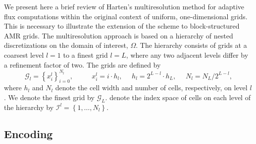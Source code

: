 \documentclass[]{article}
\begin{document}
    We present here a brief review of Harten's multiresolution method for
    adaptive flux computations within the original context of uniform,
    one-dimensional grids. This is necessary to illustrate the extension of the
    scheme to block-structured AMR grids. The multiresolution approach is based
    on a hierarchy of nested discretizations on the domain of interest,
    $\Omega$.  The hierarchy consists of grids at a coarsest level $l=1$ to a
    finest grid $l=L$, where any two adjacent levels differ by a refinement
    factor of two.  The grids are defined by
    \begin{equation}
        \bm{\mathcal{G}}_{l} = \left\{ x_{i}^{l} \right\}_{i=0}^{N_{l}}, \text{ }
        \text{ } \text{ } \text{ } x_{i}^{l} = i \cdot h_{l}, \text{ }
        \text{ } h_{l} = 2^{L-l} \cdot h_{L}, \text{ } \text{ } N_{l} = N_{L}
        / 2^{L-l},
    \end{equation}
    where $h_{l}$ and $N_{l}$ denote the cell width and number of cells,
    respectively, on level $l$. We denote the finest grid by
    $\bm{\mathcal{G}}_{L}$. denote the index space of cells on each level
    of the hierarchy by $\bm{\mathcal{I}}^{l} = \left\{ 1,\dots,N_{l} \right\}$.

    \subsection*{Encoding}
\end{document}
